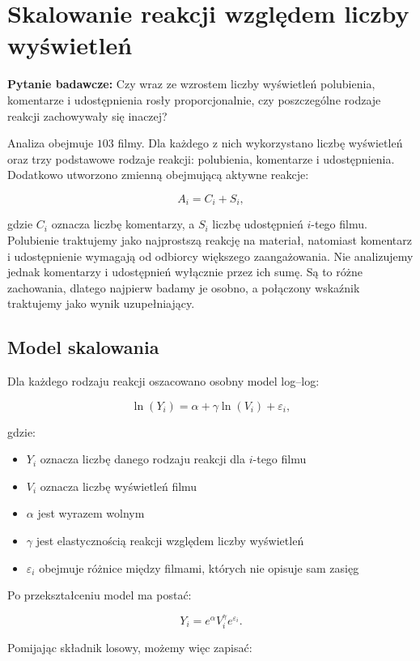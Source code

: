 \documentclass[12pt,a4paper]{article}
\begin{document}
\section{Skalowanie reakcji względem liczby wyświetleń}

\textbf{Pytanie badawcze:} Czy wraz ze wzrostem liczby wyświetleń polubienia, komentarze i udostępnienia rosły proporcjonalnie, czy poszczególne rodzaje reakcji zachowywały się inaczej?

Analiza obejmuje $103$ filmy. Dla każdego z nich wykorzystano liczbę wyświetleń oraz trzy podstawowe rodzaje reakcji: polubienia, komentarze i udostępnienia. Dodatkowo utworzono zmienną obejmującą aktywne reakcje:

\[
A_i=C_i+S_i,
\]

gdzie $C_i$ oznacza liczbę komentarzy, a $S_i$ liczbę udostępnień $i$-tego filmu. Polubienie traktujemy jako najprostszą reakcję na materiał, natomiast komentarz i udostępnienie wymagają od odbiorcy większego zaangażowania. Nie analizujemy jednak komentarzy i udostępnień wyłącznie przez ich sumę. Są to różne zachowania, dlatego najpierw badamy je osobno, a połączony wskaźnik traktujemy jako wynik uzupełniający.

\subsection{Model skalowania}

Dla każdego rodzaju reakcji oszacowano osobny model log--log:

\[
\ln(Y_i)=\alpha+\gamma\ln(V_i)+\varepsilon_i,
\]

gdzie:

\begin{itemize}
    \item $Y_i$ oznacza liczbę danego rodzaju reakcji dla $i$-tego filmu
    \item $V_i$ oznacza liczbę wyświetleń filmu
    \item $\alpha$ jest wyrazem wolnym
    \item $\gamma$ jest elastycznością reakcji względem liczby wyświetleń
    \item $\varepsilon_i$ obejmuje różnice między filmami, których nie opisuje sam zasięg
\end{itemize}

Po przekształceniu model ma postać:

\[
Y_i=e^{\alpha}V_i^{\gamma}e^{\varepsilon_i}.
\]

Pomijając składnik losowy, możemy więc zapisać:
\end{document}
